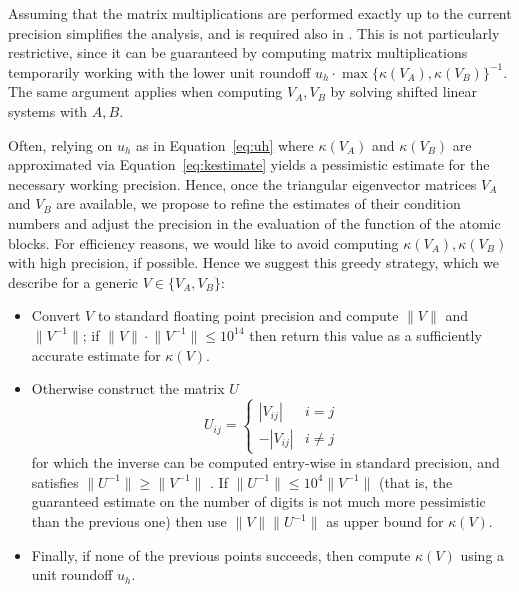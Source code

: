 \documentclass{siamart1116}
\newcommand{\norm}[1]{\lVert#1\rVert}
\begin{document}
\begin{remark} \label{rem:matmul-wp}
  Assuming that the matrix multiplications are performed 
  exactly up to the current precision
  simplifies the analysis, and is required also in
  \cite{higham2020multiprecision}. This 
  is not particularly restrictive, since it
  can be guaranteed by computing matrix multiplications
  temporarily working with the lower unit roundoff 
  $u_h \cdot \max \{ \kappa(V_A), \kappa(V_B) \}^{-1}$. 
  The same argument applies when computing $V_A, V_B$
  by solving shifted linear systems with $A, B$. 
\end{remark}
Often, relying on $u_h$ as in Equation~\ref{eq:uh} 
where $\kappa(V_A)$ and $\kappa(V_B)$ are approximated 
via Equation~\ref{eq:kestimate}
yields a pessimistic estimate for the necessary working 
precision. 
Hence, 
once the triangular eigenvector matrices $V_A$ and $V_B$ 
are available, we propose to refine the estimates of their 
condition numbers and adjust the precision in the evaluation 
of the function of the atomic blocks. For efficiency reasons, 
we would like to avoid 
computing $\kappa(V_A),\kappa(V_B)$ with high precision, 
if possible. Hence we suggest this greedy strategy, which we 
describe for a generic $V\in\{V_A,V_B\}$: 
\begin{itemize}
	\item Convert $V$ to standard floating point precision and compute $\norm{V}$ and $\norm{V^{-1}}$; if $\norm{V}\cdot\norm{V^{-1}}\leq 10^{14}$ then return this value as a sufficiently accurate estimate for $\kappa(V)$.
	\item Otherwise construct the matrix $U$
	$$
	U_{ij}=\begin{cases}
	|V_{ij}|& i=j\\
	-|V_{ij}|&i\neq j
	\end{cases}
	$$
	for which the inverse can be computed entry-wise 
	in standard precision, and satisfies 
	$\norm{U^{-1}}\geq \norm{V^{-1}}$ \cite[Section 8.2]{higham2002accuracy}. If $\norm{U^{-1}}\leq 10^4 \norm{V^{-1}}$ (that is,
	the guaranteed estimate on the number of digits is not much more pessimistic than the previous one)
	then use  $\norm{V}\norm{U^{-1}}$ as upper bound for $\kappa(V)$.
	\item Finally, if none of the previous points succeeds, then compute $\kappa(V)$ 
	  using a unit roundoff $u_h$.  
\end{itemize}  
\end{document}
